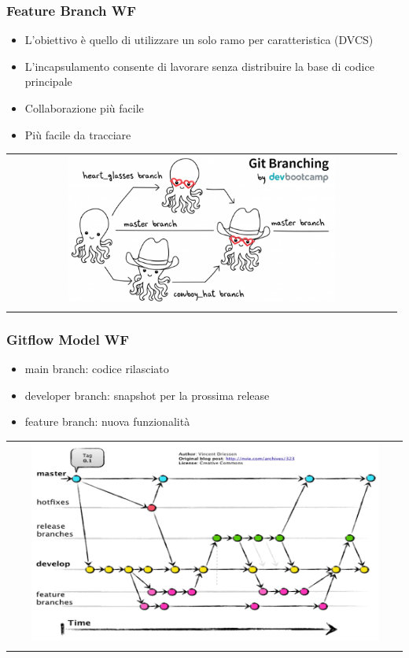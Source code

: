 \subsubsection{Feature Branch WF}
\begin{itemize}
    \item L'obiettivo è quello di utilizzare un solo ramo per caratteristica (DVCS)
    \item L'incapsulamento consente di lavorare senza distribuire la base di codice principale
    \item Collaborazione più facile
    \item Più facile da tracciare
\end{itemize}
\begin{center}
    \begin{tabular}{c}
        \\ \includegraphics[width=0.7\textwidth]{images/VCS2.png} \\ \\
    \end{tabular}
\end{center}

\subsubsection{Gitflow Model WF}
\begin{itemize}
    \item main branch: codice rilasciato
    \item developer branch: snapshot per la prossima release
    \item feature branch: nuova funzionalità
\end{itemize}
\begin{center}
    \begin{tabular}{c}
        \\ \includegraphics[width=0.9\textwidth]{images/VCS3.png} \\ \\
    \end{tabular}
\end{center}

